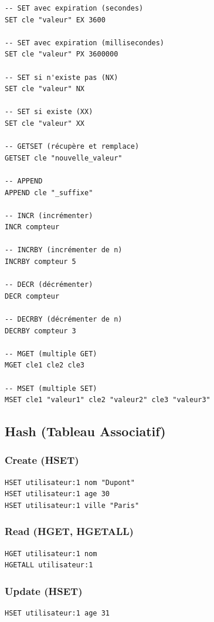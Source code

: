 \documentclass[11pt,a4paper]{article}
\begin{document}
\begin{lstlisting}
-- SET avec expiration (secondes)
SET cle "valeur" EX 3600

-- SET avec expiration (millisecondes)
SET cle "valeur" PX 3600000

-- SET si n'existe pas (NX)
SET cle "valeur" NX

-- SET si existe (XX)
SET cle "valeur" XX

-- GETSET (récupère et remplace)
GETSET cle "nouvelle_valeur"

-- APPEND
APPEND cle "_suffixe"

-- INCR (incrémenter)
INCR compteur

-- INCRBY (incrémenter de n)
INCRBY compteur 5

-- DECR (décrémenter)
DECR compteur

-- DECRBY (décrémenter de n)
DECRBY compteur 3

-- MGET (multiple GET)
MGET cle1 cle2 cle3

-- MSET (multiple SET)
MSET cle1 "valeur1" cle2 "valeur2" cle3 "valeur3"
\end{lstlisting}

\subsection{Hash (Tableau Associatif)}

\subsubsection{Create (HSET)}

\begin{lstlisting}
HSET utilisateur:1 nom "Dupont"
HSET utilisateur:1 age 30
HSET utilisateur:1 ville "Paris"
\end{lstlisting}

\subsubsection{Read (HGET, HGETALL)}

\begin{lstlisting}
HGET utilisateur:1 nom
HGETALL utilisateur:1
\end{lstlisting}

\subsubsection{Update (HSET)}

\begin{lstlisting}
HSET utilisateur:1 age 31
\end{lstlisting}
\end{document}
